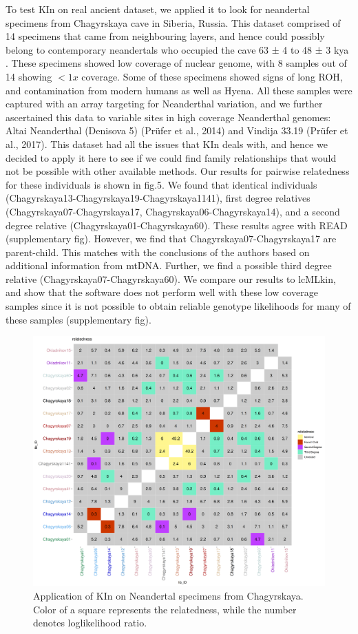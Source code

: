 \documentclass[12pt, letterpaper]{article}
\begin{document}
To test KIn on real ancient dataset, we applied it to look for neandertal specimens from Chagyrskaya cave in Siberia, Russia. This dataset comprised of 14 specimens that came from neighbouring layers, and hence could possibly belong to contemporary neandertals who occupied the cave 63 ± 4 to 48 ± 3 kya \cite{kolobova_archaeological_2020-1}. These specimens showed low coverage of nuclear genome, with 8 samples out of 14 showing $<1x$ coverage. Some of these specimens showed signs of long ROH, and contamination from modern humans as well as Hyena. All these samples were captured with an array targeting for Neanderthal variation, and we further ascertained this data to variable sites in high coverage Neanderthal genomes: Altai Neanderthal (Denisova 5) (Prüfer et al., 2014) and Vindija 33.19 (Prüfer et al., 2017). This dataset had all the issues that KIn deals with, and hence we decided to apply it here to see if we could find family relationships that would not be possible with other available methods. Our results for pairwise relatedness for these individuals is shown in fig.5. We found that identical individuals (Chagyrskaya13-Chagyrskaya19-Chagyrskaya1141), first degree relatives (Chagyrskaya07-Chagyrskaya17, Chagyrskaya06-Chagyrskaya14), and a second degree relative (Chagyrskaya01-Chagyrskaya60). These results agree with READ (supplementary fig). However, we find that Chagyrskaya07-Chagyrskaya17 are parent-child. This matches with the conclusions of the authors based on additional information from mtDNA. Further, we find a possible third degree relative (Chagyrskaya07-Chagyrskaya60). We compare our results to lcMLkin, and show that the software does not perform well with these low coverage samples since it is not possible to obtain reliable genotype likelihoods for many of these samples (supplementary fig).



\begin{figure}[h]
    \centering
    \includegraphics[width=18cm]{plots/plotimg/fil0_relatable_plot.png}
    \caption{Application of KIn on Neandertal specimens from Chagyrskaya. Color of a square represents the relatedness, while the number denotes loglikelihood ratio.}
    \label{fig5}
\end{figure}
\end{document}
